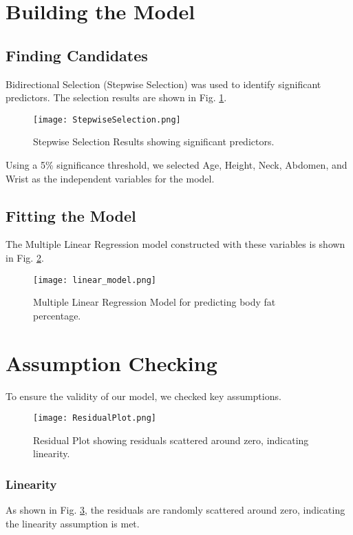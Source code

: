 \documentclass[8pt,twocolumn,twoside]{pnas-new}
\begin{document}
\section*{Building the Model}
\subsection*{Finding Candidates}
Bidirectional Selection (Stepwise Selection) was used to identify significant predictors. The selection results are shown in Fig. \ref{fig:stepwise}.

\begin{figure}[!htbp]
    \centering
    \texttt{[image: StepwiseSelection.png]}
    \caption{Stepwise Selection Results showing significant predictors.}
    \label{fig:stepwise}
\end{figure}

Using a 5\% significance threshold, we selected Age, Height, Neck, Abdomen, and Wrist as the independent variables for the model.

\subsection*{Fitting the Model}
The Multiple Linear Regression model constructed with these variables is shown in Fig. \ref{fig:linear_model}.

\begin{figure}[!htbp]
    \centering
    \texttt{[image: linear\_model.png]}
    \caption{Multiple Linear Regression Model for predicting body fat percentage.}
    \label{fig:linear_model}
\end{figure}

\section*{Assumption Checking}
To ensure the validity of our model, we checked key assumptions.

\begin{figure}[!htbp]
    \centering
    \texttt{[image: ResidualPlot.png]} 
    \caption{Residual Plot showing residuals scattered around zero, indicating linearity.}
    \label{fig:Residual_plot}
\end{figure}

\subsubsection*{Linearity}
As shown in Fig. \ref{fig:Residual_plot}, the residuals are randomly scattered around zero, indicating the linearity assumption is met.
\end{document}
